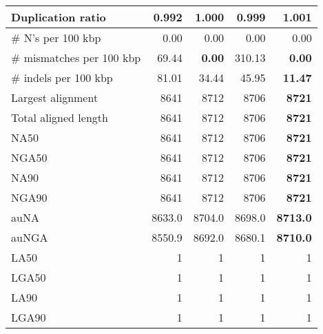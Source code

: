 \documentclass[12pt,a4paper]{article}
\begin{document}
\begin{table}[ht]
\begin{center}
\begin{tabular}{|l*{4}{|r}|}
Duplication ratio & {\bf 0.992} & 1.000 & 0.999 & 1.001 \\ \hline
\# N's per 100 kbp & 0.00 & 0.00 & 0.00 & 0.00 \\ \hline
\# mismatches per 100 kbp & 69.44 & {\bf 0.00} & 310.13 & {\bf 0.00} \\ \hline
\# indels per 100 kbp & 81.01 & 34.44 & 45.95 & {\bf 11.47} \\ \hline
Largest alignment & 8641 & 8712 & 8706 & {\bf 8721} \\ \hline
Total aligned length & 8641 & 8712 & 8706 & {\bf 8721} \\ \hline
NA50 & 8641 & 8712 & 8706 & {\bf 8721} \\ \hline
NGA50 & 8641 & 8712 & 8706 & {\bf 8721} \\ \hline
NA90 & 8641 & 8712 & 8706 & {\bf 8721} \\ \hline
NGA90 & 8641 & 8712 & 8706 & {\bf 8721} \\ \hline
auNA & 8633.0 & 8704.0 & 8698.0 & {\bf 8713.0} \\ \hline
auNGA & 8550.9 & 8692.0 & 8680.1 & {\bf 8710.0} \\ \hline
LA50 & 1 & 1 & 1 & 1 \\ \hline
LGA50 & 1 & 1 & 1 & 1 \\ \hline
LA90 & 1 & 1 & 1 & 1 \\ \hline
LGA90 & 1 & 1 & 1 & 1 \\ \hline
\end{tabular}
\end{center}
\end{table}
\end{document}

